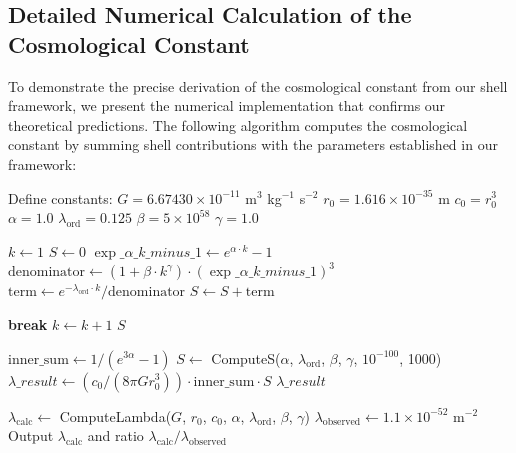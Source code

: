 \documentclass[12pt,a4paper]{article}
\begin{document}
\subsection{Detailed Numerical Calculation of the Cosmological Constant}
\label{subsec:numerical-calculation}

To demonstrate the precise derivation of the cosmological constant from our shell framework, we present the numerical implementation that confirms our theoretical predictions. The following algorithm computes the cosmological constant by summing shell contributions with the parameters established in our framework:

\begin{algorithm}
\caption{Calculation of Cosmological Constant from Shell Parameters}
\begin{algorithmic}[1]
\State Define constants:
\State $G = 6.67430 \times 10^{-11}$ m$^3$ kg$^{-1}$ s$^{-2}$ 
\State $r_0 = 1.616 \times 10^{-35}$ m 
\State $c_0 = r_0^3$ 
\State $\alpha = 1.0$ 
\State $\lambda_{\text{ord}} = 0.125$ 
\State $\beta = 5 \times 10^{58}$ 
\State $\gamma = 1.0$ 

    \State $k \gets 1$
    \State $S \gets 0$
        \State $\exp\_\alpha\_k\_minus\_1 \gets e^{\alpha \cdot k} - 1$
        \State $\text{denominator} \gets (1 + \beta \cdot k^{\gamma}) \cdot (\exp\_\alpha\_k\_minus\_1)^3$
        \State $\text{term} \gets e^{-\lambda_{\text{ord}} \cdot k} / \text{denominator}$
        \State $S \gets S + \text{term}$
        
         
            \State \textbf{break}
        \EndIf
        \State $k \gets k + 1$
    \EndWhile
    \State \Return $S$
\EndFunction

    \State $\text{inner\_sum} \gets 1 / (e^{3\alpha} - 1)$ 
    \State $S \gets$ ComputeS($\alpha$, $\lambda_{\text{ord}}$, $\beta$, $\gamma$, $10^{-100}$, 1000)
    \State $\lambda\_result \gets (c_0 / (8\pi G r_0^3)) \cdot \text{inner\_sum} \cdot S$
    \State \Return $\lambda\_result$
\EndFunction

\State $\lambda_{\text{calc}} \gets$ ComputeLambda($G$, $r_0$, $c_0$, $\alpha$, $\lambda_{\text{ord}}$, $\beta$, $\gamma$)
\State $\lambda_{\text{observed}} \gets 1.1 \times 10^{-52}$ m$^{-2}$ 
\State Output $\lambda_{\text{calc}}$ and ratio $\lambda_{\text{calc}}/\lambda_{\text{observed}}$
\end{algorithmic}
\end{algorithm}
\end{document}
